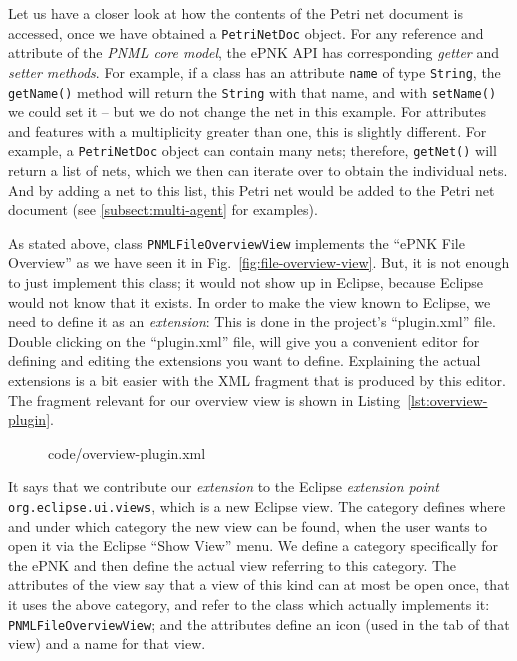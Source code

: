 Let us have a closer look at how the contents of the Petri net
document is accessed, once we have obtained a {\tt PetriNetDoc}
object. For any reference and attribute of the \emph{PNML core model},%
the ePNK API%
has corresponding \emph{getter}%
 and \emph{setter methods}.%
For example, if a class has an attribute {\tt name} of type {\tt String}, the
{\tt getName()} method will return the {\tt String} with that name, and with
{\tt setName()} we could set it -- but we do not change the net in this example.
For attributes and features with a multiplicity greater than one, this is
slightly different. For example, a {\tt PetriNetDoc} object can contain many nets;
therefore, {\tt getNet()} will return a list of nets, which we then can
iterate over to obtain the individual nets. And by adding a net
to this list, this Petri net would be added to the Petri net
document (see \ref{subsect:multi-agent} for examples).

As stated above, class {\tt PNMLFileOverviewView}
implements the ``ePNK File Overview'' as we have seen it in
Fig.~\ref{fig:file-overview-view}. But, it is not enough to just implement
this class; it would not show up in Eclipse, because Eclipse would
not know that it exists. In order to make the view known to
Eclipse, we need to define it as an \emph{extension}:%
This is done in the project's ``plugin.xml''%
file. Double clicking on the
``plugin.xml'' file, will give you a convenient editor for defining and	editing
the extensions you want to define. Explaining the actual extensions is a bit
easier with the XML fragment that is produced by this editor. The
fragment relevant for our overview view is shown in Listing~\ref{lst:overview-plugin}.
%
\begin{figure}[htbp!]
%
  {code/overview-plugin.xml}
\end{figure}
% 
It says that we contribute our \emph{extension}%
to the Eclipse \emph{extension point}%
{\tt org.eclipse.ui.views}, which is a
new Eclipse view. The category defines where and under which category
the new view can be found, when the user wants to open it
via the Eclipse ``Show View'' menu.
We define a category specifically for the ePNK and then define the actual view
referring to this category.
The attributes of the view say that a view of this kind can
at most be open once, that it uses the above category, and refer to the
class which actually implements it: {\tt PNMLFileOverviewView};
and the attributes define an icon (used in the tab of that view) and 
a name for that view.

